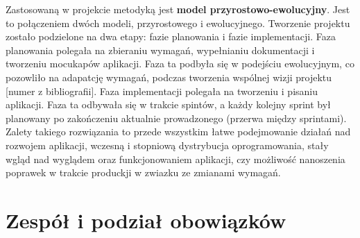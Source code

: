 \indent
Zastosowaną w projekcie metodyką jest \textbf{model przyrostowo-ewolucyjny}.
Jest to połączeniem dwóch modeli, przyrostowego i ewolucyjnego.\cite{roger2004} Tworzenie projektu zostało podzielone na dwa etapy: fazie planowania i fazie implementacji. Faza planowania polegała na zbieraniu wymagań, wypełnianiu dokumentacji i tworzeniu mocukapów aplikacji. Faza ta podbyła się w podejściu ewolucyjnym, co pozowliło na adapatcję wymagań, podczas tworzenia wspólnej wizji projektu [numer z bibliografii]. Faza implementacji polegała na tworzeniu i pisaniu aplikacji. Faza ta odbywała się w trakcie spintów, a każdy kolejny sprint był planowany po zakończeniu aktualnie prowadzonego (przerwa między sprintami). Zalety takiego rozwiązania to przede wszystkim łatwe podejmowanie działań nad rozwojem aplikacji, wczesną i stopniową dystrybucja oprogramowania, stały wgląd nad wyglądem oraz funkcjonowaniem aplikacji, czy możliwość nanoszenia poprawek w trakcie produckji w zwiazku ze zmianami wymagań.

\section{Zespół i podział obowiązków}




